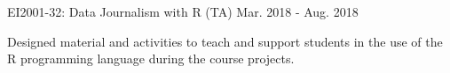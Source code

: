 \begin{cventries}
  \cventry
    {EI2001-32: Data Journalism with R (TA)} %
    {} %
    {} %
    {Mar. 2018 - Aug. 2018} %
    {
      \begin{cvitems} %
        \item {Designed material and activities to teach and support students in the use of the R programming language during the course projects.}
      \end{cvitems}
    }


\end{cventries}
